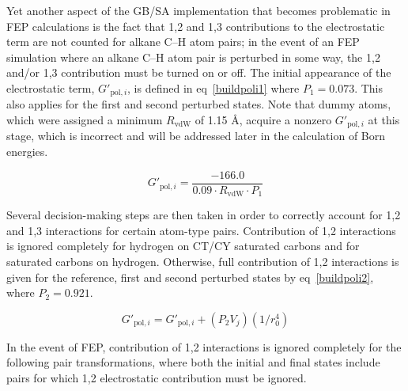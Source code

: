 \documentclass[12pt]{report}
\def\equlab{eq}\def\equslab{Eqs.}
\newcommand*\eq[1]{\equlab~\ref{#1}}
\begin{document}
Yet another aspect of the GB/SA implementation that becomes problematic in FEP calculations is the fact that 1,2 and 1,3 contributions to the electrostatic term are not counted for alkane C--H atom pairs; in the event of an FEP simulation where an alkane C--H atom pair is perturbed in some way, the 1,2 and/or 1,3 contribution must be turned on or off. The initial appearance of the electrostatic term, $G'_{ \textrm{pol},i}$, is defined in \eq{buildpoli1} where $P_{1} = 0.073$. This also applies for the first and second perturbed states. Note that dummy atoms, which were assigned a minimum $R_{ \textrm{vdW}}$ of 1.15 \AA, acquire a nonzero  $G'_{ \textrm{pol},i}$ at this stage, which is incorrect and will be addressed later in the calculation of Born energies.

\vspace*{-0.4cm}
\begin{equation}
\label{buildpoli1}
G'_{ \textrm{pol},i} = \frac{-166.0}{0.09\cdot R_{ \textrm{vdW}}\cdot P_{1}}
\end{equation}
\vspace*{-0.5cm}


Several decision-making steps are then taken in order to correctly account for 1,2 and 1,3 interactions for certain atom-type pairs. Contribution of 1,2 interactions is ignored completely for hydrogen on CT/CY saturated carbons and for saturated carbons on hydrogen. Otherwise, full contribution of 1,2 interactions is given for the reference, first and second perturbed states by \eq{buildpoli2}, where $P_{2} = 0.921$.

\begin{equation}
\label{buildpoli2}
G'_{ \textrm{pol},i} = G'_{ \textrm{pol},i} + (P_{2}V_{j})(1/r^{4}_{0})
\end{equation}
\vspace*{-0.4cm}

In the event of FEP, contribution of 1,2 interactions is ignored completely for the following pair transformations, where both the initial and final states include pairs for which 1,2 electrostatic contribution must be ignored.
\end{document}
